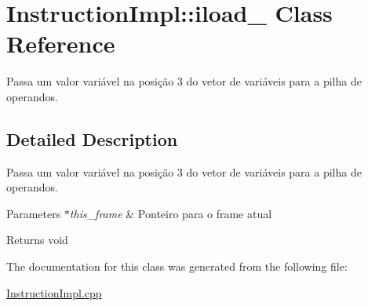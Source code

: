 \hypertarget{class_instruction_impl_1_1iload__3}{}\section{Instruction\+Impl\+:\+:iload\+\_ Class Reference}
\label{class_instruction_impl_1_1iload__3}


Passa um valor variável na posição 3 do vetor de variáveis para a pilha de operandos.  




\subsection{Detailed Description}
Passa um valor variável na posição 3 do vetor de variáveis para a pilha de operandos. 


\begin{DoxyParams}{Parameters}
{\em $\ast$this\+\_\+frame} & Ponteiro para o frame atual \\
\hline
\end{DoxyParams}
\begin{DoxyReturn}{Returns}
void 
\end{DoxyReturn}


The documentation for this class was generated from the following file\+:\begin{DoxyCompactItemize}
\item 
\hyperlink{_instruction_impl_8cpp}{Instruction\+Impl.\+cpp}\end{DoxyCompactItemize}
